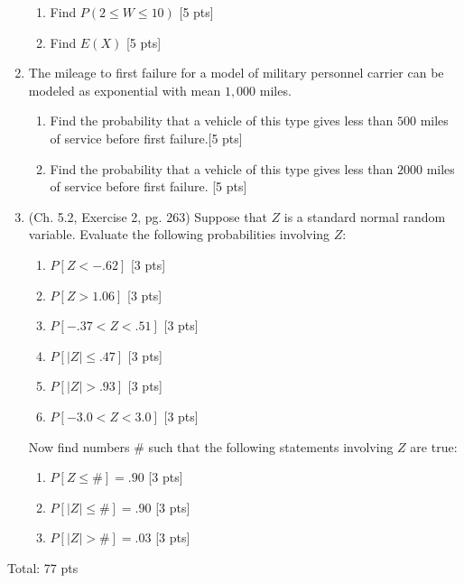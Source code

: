 \documentclass[11pt]{article}\usepackage[]{graphicx}\usepackage[]{color}
\begin{document}
\begin{enumerate}
\begin{enumerate}
                   \item  Find $P(2 \le W \le 10)$ [5 pts]
                   
                   \item  Find $E(X)$ [5 pts]

      \end{enumerate}

  \item The mileage to first failure for a model of military personnel carrier can be modeled as exponential with mean $1,000$ miles.
  
          \begin{enumerate}
                \item Find the probability that a vehicle of this type gives less than $500$ miles of service before first failure.[5 pts] 
                
                \item Find the probability that a vehicle of this type gives less than $2000$ miles of service before first failure. [5 pts]
                
          \end{enumerate}
          
  \item (Ch. 5.2, Exercise 2, pg. 263) Suppose that $Z$ is a standard normal random variable. Evaluate the following probabilities involving $Z$: 
  
          \begin{enumerate}
                \item $P[Z < -.62]$ [3 pts]
                \item $P[Z > 1.06]$ [3 pts]
                \item $P[-.37 < Z < .51]$ [3 pts]
                \item $P[|Z| \le .47]$ [3 pts]
                \item $P[|Z| > .93]$ [3 pts]
                \item $P[-3.0 < Z < 3.0]$ [3 pts]
          \end{enumerate}      
    
    Now find numbers $\#$ such that the following statements involving $Z$ are true:
          \begin{enumerate}
                    \item $P[Z \le \#] = .90$ [3 pts]
                    \item  $P[|Z| \le \#] = .90$ [3 pts]
                    \item $P[|Z| > \#] = .03$ [3 pts]
          \end{enumerate}          




\end{enumerate}
Total: 77 pts
\end{document}
